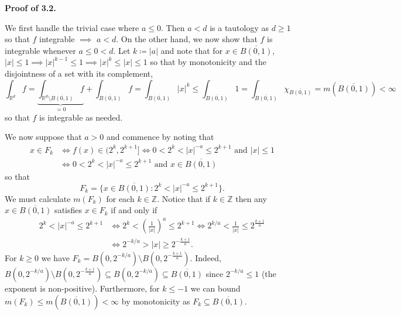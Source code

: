 \noindent \textbf{Proof of 3.2.}

\noindent We first handle the trivial case where \( a \leq 0 \). Then \( a < d \) is a tautology as \( d \geq 1 \) so that \( f \) integrable \( \implies  \) \( a < d \). On the other hand, we now show that \( f \) is integrable whenever \( a \leq 0 < d \). Let \( k \coloneqq |a| \) and note that for \( x \in \overline{B(0,1)} \), \( |x| \leq 1 \implies |x|^{k-1} \leq 1 \implies |x|^{k} \leq |x| \leq 1  \) so that by monotonicity and the disjointness of a set with its complement, \[\int_{\mathbb{R}^{d} } f = \underbrace{ \int_{\mathbb{R}^{d} \setminus \overline{B(0,1)}} f}_{=0}  + \int_{\overline{B(0,1)}} f = \int_{\overline{B(0,1)}} |x|^{k} \leq \int_{\overline{B(0,1)}} 1 = \int_{\overline{B(0,1)}} \chi_{\overline{B(0,1)}} = m(\overline{B(0,1)}) < \infty   \] so that \( f \) is integrable as needed.

We now suppose that \( a > 0 \) and commence by noting that
\begin{align*}
	x \in F_{k}  &\iff f(x) \in (2^{k} , 2^{k+1} ] \iff  0 < 2^{k} < |x|^{-a} \leq 2^{k+1}  \mbox{ and } |x| \leq 1 \\
		     &\iff 0<2^{k} <|x|^{-a} \leq 2^{k+1} \mbox{ and } x \in \overline{B(0,1)}
\end{align*}
so that \[F_{k} = \{ x \in \overline{B(0,1)} : 2^{k} < |x|^{-a} \leq 2^{k+1}  \}. \] We must calculate \( m(F_{k} ) \) for each \( k \in \mathbb{Z}  \). Notice that if \( k \in \mathbb{Z} \) then any \( x \in \overline{B(0,1)} \) satisfies \( x \in F_{k}  \) if and only if
\begin{align*}
	2^{k} < |x|^{-a} \leq 2^{k+1}  &\iff 2^{k} < \left ( {\frac{1}{|x|} } \right )^{a} \leq 2^{k+1} \iff 2^{k/a} < \frac{1}{|x|} \leq 2^{\frac{k+1}{a} } \\
				       &\iff 2^{-k/a} > |x| \geq 2^{-\frac{k+1}{a} }.
\end{align*}
For \( k \geq 0 \) we have \( F_{k} = B(0, 2^{-k/a} ) \setminus B(0, 2^{-\frac{k+1}{a} } ) \). Indeed, \( B(0, 2^{-k/a} ) \setminus B(0, 2^{-\frac{k+1}{a} } ) \subseteq B(0,2^{-k/a} ) \subseteq \overline{B(0,1)}\) since \( 2^{-k/a} \leq 1  \) (the exponent is non-positive). Furthermore, for \( k \leq -1 \) we can bound \( m(F_{k}) \leq m(\overline{B(0,1)}) < \infty \) by monotonicity as \( F_{k} \subseteq \overline{B(0,1)} \).

